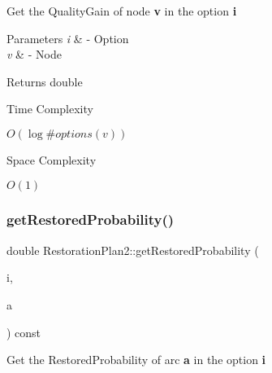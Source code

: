 Get the Quality\+Gain of node {\bfseries v} in the option {\bfseries i} 


\begin{DoxyParams}{Parameters}
{\em i} & -\/ Option \\
\hline
{\em v} & -\/ Node \\
\hline
\end{DoxyParams}
\begin{DoxyReturn}{Returns}
double 
\end{DoxyReturn}
\begin{DoxyRefDesc}{Time Complexity}
\item[\hyperlink{time__time000019}{Time Complexity}]$O(\log \#options(v))$ \end{DoxyRefDesc}
\begin{DoxyRefDesc}{Space Complexity}
\item[\hyperlink{space__space000019}{Space Complexity}]$O(1)$ \end{DoxyRefDesc}
\mbox{\label{class_restoration_plan2_a22980a28d0904266602a16542fa75110}} 
\subsubsection{\texorpdfstring{get\+Restored\+Probability()}{getRestoredProbability()}}
{\footnotesize\ttfamily double Restoration\+Plan2\+::get\+Restored\+Probability (\begin{DoxyParamCaption}\item[{\hyperlink{class_restoration_plan2_aff164a2726831342bf87af5e11df1064}{Option}}]{i,  }\item[{Graph\+\_\+t\+::\+Arc}]{a }\end{DoxyParamCaption}) const\hspace{0.3cm}{\ttfamily [inline]}}



Get the Restored\+Probability of arc {\bfseries a} in the option {\bfseries i} 


